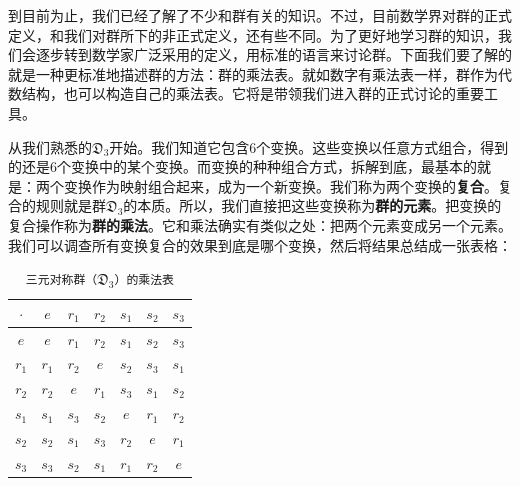 \documentclass[12pt,UTF8,fontset=none]{ctexbook}
\begin{document}
到目前为止，我们已经了解了不少和群有关的知识。不过，目前数学界对群的正式定义，和我们对群所下的非正式定义，还有些不同。为了更好地学习群的知识，我们会逐步转到数学家广泛采用的定义，用标准的语言来讨论群。下面我们要了解的就是一种更标准地描述群的方法：群的乘法表。就如数字有乘法表一样，群作为代数结构，也可以构造自己的乘法表。它将是带领我们进入群的正式讨论的重要工具。

从我们熟悉的$\mathfrak{D}_3$开始。我们知道它包含$6$个变换。这些变换以任意方式组合，得到的还是$6$个变换中的某个变换。而变换的种种组合方式，拆解到底，最基本的就是：两个变换作为映射组合起来，成为一个新变换。我们称为两个变换的\textbf{复合}。复合的规则就是群$\mathfrak{D}_3$的本质。所以，我们直接把这些变换称为\textbf{群的元素}。把变换的复合操作称为\textbf{群的乘法}。它和乘法确实有类似之处：把两个元素变成另一个元素。我们可以调查所有变换复合的效果到底是哪个变换，然后将结果总结成一张表格：

\vspace{12pt}
\begin{table}[htbp]
    \centering
    \caption{\texttt{三元对称群（$\mathfrak{D}_3$）的乘法表}}
    \label{tab:S3_multiplication}
    \renewcommand{\arraystretch}{1.5} 
    \setlength{\tabcolsep}{10pt} 
    \begin{tabular}{|c|c!{\color{gray!50}\vrule}c!{\color{gray!50}\vrule}c!{\color{gray!50}\vrule}c!{\color{gray!50}\vrule}c!{\color{gray!50}\vrule}c|}
        \hline
        $\cdot$ & $e$ & $r_1$ & $r_2$ & $s_1$ & $s_2$ & $s_3$ \\
        \hline
        $e$     & $e$ & $r_1$ & $r_2$ & $s_1$ & $s_2$ & $s_3$ \\
        \hline
        $r_1$   & $r_1$ & $r_2$ & $e$   & $s_2$ & $s_3$ & $s_1$ \\
        \hline
        $r_2$   & $r_2$ & $e$   & $r_1$ & $s_3$ & $s_1$ & $s_2$ \\
        \hline
        $s_1$   & $s_1$ & $s_3$ & $s_2$ & $e$   & $r_1$ & $r_2$ \\
        \hline
        $s_2$   & $s_2$ & $s_1$ & $s_3$ & $r_2$ & $e$   & $r_1$ \\
        \hline
        $s_3$   & $s_3$ & $s_2$ & $s_1$ & $r_1$ & $r_2$ & $e$   \\
        \hline
    \end{tabular}
\end{table}
\end{document}

